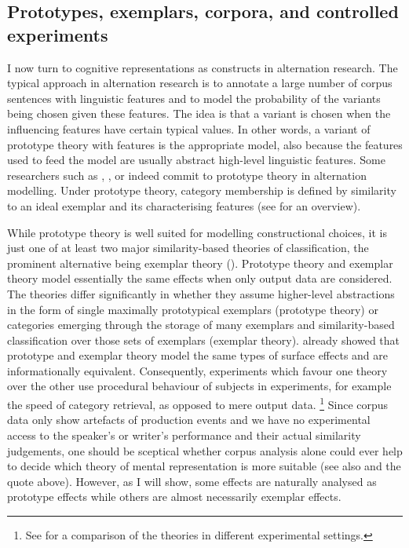 \subsection{Prototypes, exemplars, corpora, and controlled experiments}
\label{sec:prototypesexemplarscorporaandcontrolledexperiments}

I now turn to cognitive representations as constructs in alternation research.
The typical approach in alternation research is to annotate a large number of corpus sentences with linguistic features and to model the probability of the variants being chosen given these features.
The idea is that a variant is chosen when the influencing features have certain typical values.
In other words, a variant of prototype theory with features \citep{Rosch1978} is the appropriate model, also because the features used to feed the model are usually abstract high-level linguistic features. 
Some researchers such as \cite{Gries2003}, \cite{NessetJanda2010}, or \cite{Schaefer2016c} indeed commit to prototype theory in alternation modelling.
Under prototype theory, category membership is defined by similarity to an ideal exemplar and its characterising features (see \citealp{Taylor2008} for an overview).

While prototype theory is well suited for modelling constructional choices, it is just one of at least two major similarity-based theories of classification, the prominent alternative being exemplar theory (\citealp{MedinSchaffer1978,Hintzman1986}).
Prototype theory and exemplar theory model essentially the same effects when only output data are considered.
The theories differ significantly in whether they assume higher-level abstractions in the form of single maximally prototypical exemplars (prototype theory) or categories emerging through the storage of many exemplars and similarity-based classification over those sets of exemplars (exemplar theory).
\cite{Barsalou1990} already showed that prototype and exemplar theory model the same types of surface effects and are informationally equivalent.
Consequently, experiments which favour one theory over the other use procedural behaviour of subjects in experiments, for example the speed of category retrieval, as opposed to mere output data.%
\footnote{See \citet{StormsEa2000} for a comparison of the theories in different experimental settings.}
Since corpus data only show artefacts of production events and we have no experimental access to the speaker's or writer's performance and their actual similarity judgements, one should be sceptical whether corpus analysis alone could ever help to decide which theory of mental representation is more suitable (see also \citealp[22]{Gries2003} and the \citealp[486--487]{Dabrowska2016} quote above).
However, as I will show, some effects are naturally analysed as prototype effects while others are almost necessarily exemplar effects.

